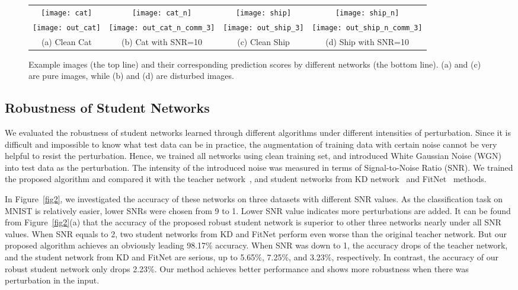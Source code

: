 \documentclass[journal]{IEEEtran}
\newcommand{\Fref}[1]{Figure~\ref{#1}}
\begin{document}
\begin{figure*}
\setlength{\abovecaptionskip}{0.2cm}
\setlength{\belowcaptionskip}{0.2cm}
\centering

\begin{tabular}{cccc}
\centering
\small
\texttt{[image: cat]} & \texttt{[image: cat\_n]} &\texttt{[image: ship]} & \texttt{[image: ship\_n]} \\
\texttt{[image: out\_cat]} & \texttt{[image: out\_cat\_n\_comm\_3]} &\texttt{[image: out\_ship\_3]} & \texttt{[image: out\_ship\_n\_comm\_3]} \\
(a) Clean Cat & (b) Cat with SNR=10 & (c) Clean Ship & (d) Ship with SNR=10 \\
\end{tabular}
\caption{Example images (the top line) and their corresponding prediction scores by different networks (the bottom line). (a) and (c) are pure images, while (b) and (d) are disturbed images.}
\label{fig3}
\end{figure*}


\subsection{Robustness of Student Networks}

We evaluated the robustness of student networks learned through different algorithms under different intensities of perturbation. Since it is difficult and impossible to know what test data can be in practice, the augmentation of training data with certain noise cannot be very helpful to resist the perturbation. Hence, we trained all networks using clean training set, and introduced White Gaussian Noise (WGN) into test data as the perturbation. The intensity of the introduced noise was measured in terms of Signal-to-Noise Ratio (SNR). We trained the proposed algorithm and compared it with the teacher network~\cite{goodfellow2013maxout}, and student networks from KD network~\cite{hinton2015distilling} and FitNet~\cite{romero2014fitnets} methods.

In \Fref{fig2}, we investigated the accuracy of these networks on three datasets with different SNR values. As the classification task on MNIST is relatively easier, lower SNRs were chosen from 9 to 1. Lower SNR value indicates more perturbations are added. It can be found from \Fref{fig2}(a) that the accuracy of the proposed robust student network is superior to other three networks nearly under all SNR values. When SNR equals to 2, two student networks from KD and FitNet perform even worse than the original teacher network. But our proposed algorithm achieves an obviously leading 98.17\% accuracy. When SNR was down to 1, the accuracy drops of the teacher network, and the student network from KD and FitNet are serious, up to 5.65\%, 7.25\%, and 3.23\%, respectively. In contrast, the accuracy of our robust student network only drops 2.23\%. Our method achieves better performance and shows more robustness when there was perturbation in the input. 
\end{document}

